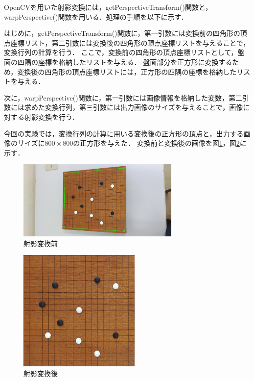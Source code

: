 \documentclass[openright]{nitocs}
\numberwithin{equation}{section}
\begin{document}
            OpenCVを用いた射影変換には，getPerspectiveTransform()関数と，warpPerspective()関数を用いる．処理の手順を以下に示す．

            はじめに，getPerspectiveTransform()関数に，第一引数には変換前の四角形の頂点座標リスト，第二引数には変換後の四角形の頂点座標リストを与えることで，変換行列の計算を行う．
            ここで，変換前の四角形の頂点座標リストとして，盤面の四隅の座標を格納したリストを与える．
            盤面部分を正方形に変換するため，変換後の四角形の頂点座標リストには，正方形の四隅の座標を格納したリストを与える．

            次に，warpPerspective()関数に，第一引数には画像情報を格納した変数，第二引数には求めた変換行列，第三引数には出力画像のサイズを与えることで，画像に対する射影変換を行う．

            今回の実験では，変換行列の計算に用いる変換後の正方形の頂点と，出力する画像のサイズに$800\times800$の正方形を与えた．
            変換前と変換後の画像を図\ref{cornerImg}，図\ref{boardImg}に示す．

            \begin{figure}[tb] %
                \begin{center}
                \includegraphics[clip,width=80mm]{DSC_0041/cornerImg.jpg} 
                \caption{射影変換前}
                \label{cornerImg}
                \end{center}
            \end{figure}
            \begin{figure}[tb] %
                \begin{center}
                \includegraphics[clip,width=60mm]{DSC_0041/boardImg.jpg} 
                \caption{射影変換後}
                \label{boardImg}
                \end{center}
            \end{figure}
\end{document}
